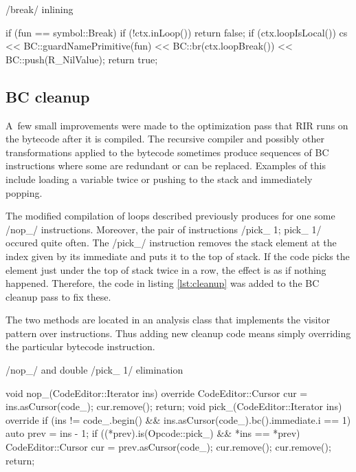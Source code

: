 \begin{listing}[htbp]
  \caption{\label{lst:break}\rinline/break/ inlining}
  \begin{cppcode}
if (fun == symbol::Break) {
    if (!ctx.inLoop()) return false;
    if (ctx.loopIsLocal()) {
        cs << BC::guardNamePrimitive(fun)
           << BC::br(ctx.loopBreak())
           << BC::push(R_NilValue);
        return true;
    }
}
  \end{cppcode}
\end{listing}


\subsection{BC cleanup}

A~few small improvements were made to the optimization pass that RIR runs on the bytecode after it is compiled. The recursive compiler and possibly other transformations applied to the bytecode sometimes produce sequences of BC instructions where some are redundant or can be replaced. Examples of this include loading a variable twice or pushing to the stack and immediately popping.

The modified compilation of loops described previously produces for one some \cinline/nop_/ instructions. Moreover, the pair of instructions \cinline/pick_ 1; pick_ 1/ occured quite often. The \cinline/pick_/ instruction removes the stack element at the index given by its immediate and puts it to the top of stack. If the code picks the element just under the top of stack twice in a row, the effect is as if nothing happened. Therefore, the code in listing \ref{lst:cleanup} was added to the BC cleanup pass to fix these.

The two methods are located in an analysis class that implements the visitor pattern over instructions. Thus adding new cleanup code means simply overriding the particular bytecode instruction.

\begin{listing}[htbp]
  \caption{\label{lst:cleanup}\cinline/nop_/ and double \cinline/pick_ 1/ elimination}
  \begin{cppcode}
void nop_(CodeEditor::Iterator ins) override {
    CodeEditor::Cursor cur = ins.asCursor(code_);
    cur.remove();
    return;
}
void pick_(CodeEditor::Iterator ins) override {
    if (ins != code_.begin() &&
        ins.asCursor(code_).bc().immediate.i == 1) {
        auto prev = ins - 1;
        if ((*prev).is(Opcode::pick_) && *ins == *prev) {
            CodeEditor::Cursor cur = prev.asCursor(code_);
            cur.remove();
            cur.remove();
            return;
        }
    }
}
  \end{cppcode}
\end{listing}

